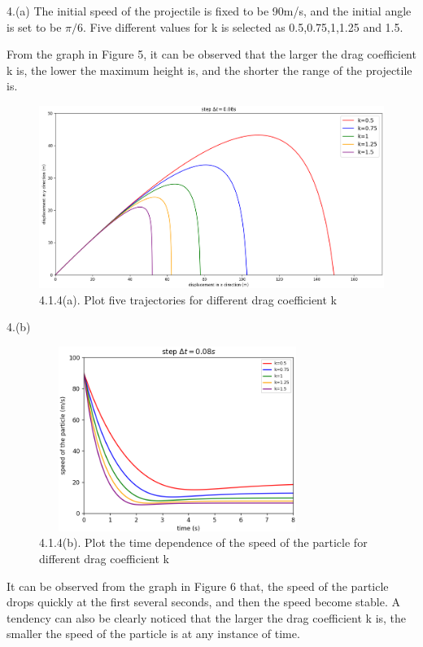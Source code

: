 \documentclass{book}
\begin{document}
\vspace{0.03\textheight}
{\Large 4.(a)}
The initial speed of the projectile is fixed to be 90m/s, and the initial angle is set to be $\pi/6$. Five different values for k is selected as 0.5,0.75,1,1.25 and 1.5.

From the graph in Figure 5, it can be observed that the larger the drag coefficient k is, the lower the maximum height is, and the shorter the range of the projectile is.
\begin{figure}[H]
  \centering
  \includegraphics[scale=0.3]{project4.1.4(a).png}
  \caption{4.1.4(a). Plot five trajectories for different drag coefficient k}
\end{figure}
\vspace{0.01\textheight}
{\Large 4.(b)}

\begin{figure}[H]
  \centering
  \includegraphics[width=9cm,height=6cm]{project4.1.4(b).png}
  \caption{4.1.4(b). Plot the time dependence of the speed of the particle for different drag coefficient k}
\end{figure}

It can be observed from the graph in Figure 6 that, the speed of the particle drops quickly at the first several seconds, and then the speed become stable.
A tendency can also be clearly noticed that the larger the drag coefficient k is, the smaller the speed of the particle is at any instance of time.
\end{document}
